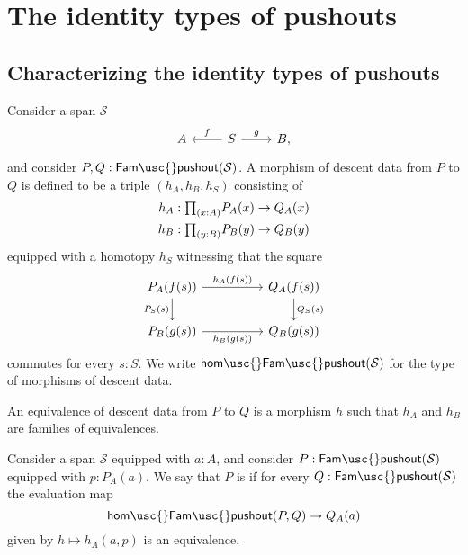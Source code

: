 \section{The identity types of pushouts}

\subsection{Characterizing the identity types of pushouts}

\begin{defn}
  Consider a span $\mathcal{S}$
  \begin{equation*}
    \begin{tikzcd}
      A & S \arrow[l,swap,"f"] \arrow[r,"g"] & B,
    \end{tikzcd}
  \end{equation*}
  and consider $P,Q:\mathsf{Fam\usc{}pushout}(\mathcal{S})$. A morphism of descent data from $P$ to $Q$ is defined to be a triple $(h_A,h_B,h_S)$ consisting of
  \begin{align*}
    h_A & : \prd{x:A} P_A(x)\to Q_A(x) \\
    h_B & : \prd{y:B} P_B(y)\to Q_B(y)
  \end{align*}
  equipped with a homotopy $h_S$ witnessing that the square
  \begin{equation*}
    \begin{tikzcd}[column sep=huge]
      P_A(f(s)) \arrow[r,"h_A(f(s))"] \arrow[d,swap,"P_S(s)"] & Q_A(f(s)) \arrow[d,"Q_S(s)"] \\
      P_B(g(s)) \arrow[r,swap,"h_B(g(s))"] & Q_B(g(s))
    \end{tikzcd}
  \end{equation*}
  commutes for every $s:S$. We write $\mathsf{hom\usc{}Fam\usc{}pushout}(\mathcal{S})$ for the type of morphisms of descent data.

  An equivalence of descent data from $P$ to $Q$ is a morphism $h$ such that $h_A$ and $h_B$ are families of equivalences.
\end{defn}

\begin{defn}
  Consider a span $\mathcal{S}$ equipped with $a:A$, and consider
  $P:\mathsf{Fam\usc{}pushout}(\mathcal{S})$ equipped with $p:P_A(a)$. We say that $P$ is  if for every $Q:\mathsf{Fam\usc{}pushout}(\mathcal{S})$ the evaluation map
  \begin{equation*}
    \mathsf{hom\usc{}Fam\usc{}pushout}(P,Q)\to Q_A(a)
  \end{equation*}
  given by $h\mapsto h_A(a,p)$ is an equivalence.
\end{defn}

